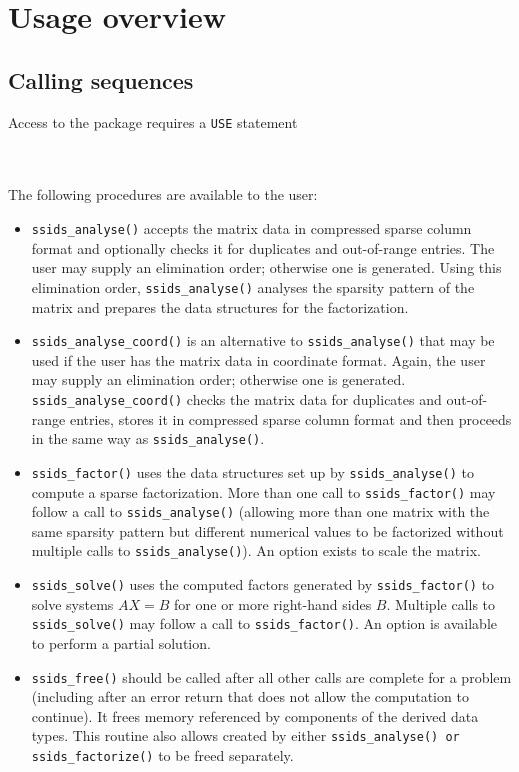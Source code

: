 
\section{Usage overview}

\subsection{Calling sequences}

Access to the package requires a {\tt USE} statement \\ \\
\indent\hspace{8mm}{\tt use spral\_ssids} \\

\medskip

\noindent
The following procedures are available to the user:
\begin{itemize}
\item {\tt ssids\_analyse()} accepts the matrix data in compressed
sparse column format and optionally checks it for duplicates and  out-of-range entries.
The user may supply an elimination order; otherwise
one is generated. Using this elimination order,
{\tt ssids\_analyse()} analyses the sparsity pattern of
the matrix and prepares the data structures for the factorization.

 \item {\tt ssids\_analyse\_coord()} is an alternative to
{\tt ssids\_analyse()} that may be used if the user has
the matrix data in coordinate
format. Again, the user may supply an elimination order; otherwise
one is generated. {\tt ssids\_analyse\_coord()}
checks the matrix data  for duplicates and  out-of-range entries,
stores
it in compressed sparse column format and then proceeds
in the same way as {\tt ssids\_analyse()}.

\item {\tt ssids\_factor()} uses the data structures
set up by {\tt ssids\_analyse()} to compute a sparse
factorization. More than one call to  {\tt ssids\_factor()}
may follow a call to {\tt ssids\_analyse()} (allowing more than
one matrix with the same sparsity pattern but different
numerical values to be factorized without multiple calls to
{\tt ssids\_analyse()}).
An option exists to scale the matrix.

\item {\tt ssids\_solve()} uses the computed factors generated
by  {\tt ssids\_factor()}
to solve systems ${AX= B}$
for one or more right-hand sides $B$.
Multiple calls to {\tt ssids\_solve()} may follow a call to
{\tt ssids\_factor()}.
An option is available to perform a partial solution.

\item {\tt ssids\_free()} should be called after all other calls
are complete for a problem (including after an error
return that does not allow the computation
to continue). It frees memory referenced by components of
the derived data types. This routine also allows created by either
{\tt ssids\_analyse() or ssids\_factorize()} to be freed separately.
\end{itemize}

